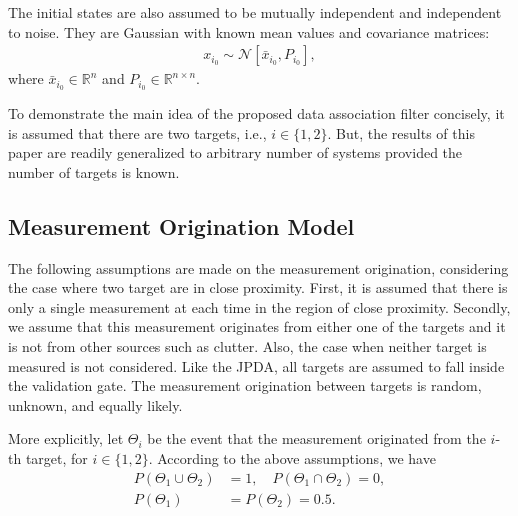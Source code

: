 \documentclass[letterpaper, 10pt, conference]{ieeeconf}
\renewcommand{\Re}{\ensuremath{\mathbb{R}}}
\begin{document}
The initial states are also assumed to be mutually independent and independent to noise. They are Gaussian with known mean values and covariance matrices:
\begin{align}
x_{i_0} \sim \mathcal{N}[\bar x_{i_0}, P_{i_0}],\label{eqn:xi0}
\end{align}
where $\bar x_{i_0}\in\Re^n$ and $P_{i_0}\in\Re^{n\times n}$. 

To demonstrate the main idea of the proposed data association filter concisely, it is assumed that there are two targets, i.e., $i\in\{1,2\}$. But, the results of this paper are readily generalized to arbitrary number of systems provided the number of targets is known.


\subsection{Measurement Origination Model}
\label{DAP}


The following assumptions are made on the measurement origination, considering the case where two target are in close proximity. First, it is assumed that there is only a single measurement at each time in the region of close proximity. Secondly, we assume that this measurement originates from either one of the targets and it is not from other sources such as clutter. Also, the case when neither target is measured is not considered. Like the JPDA, all targets are assumed to fall inside the validation gate. The measurement origination between targets is random, unknown, and equally likely. 

More explicitly, let $\Theta_i$ be the event that the measurement originated from the $i$-th target, for $i\in\{1,2\}$. According to the above assumptions, we have
\begin{align}
P(\Theta_1\cup \Theta_2)&=1,\quad
P(\Theta_1\cap \Theta_2)=0,\\
P(\Theta_1)&=P(\Theta_2)=0.5.\label{eqn:MeaOrig}
\end{align}
\end{document}
